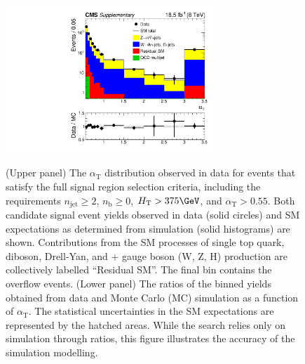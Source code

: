 \clearpage
\begin{figure}[h!]
  \begin{center}
    \includegraphics[width=0.7\textwidth]{AlphaT_SR} \\
    \caption{ (Upper panel) The $\alpha_\text{T}$ distribution
      observed in data for events that satisfy the full signal region
      selection criteria, including the requirements $n_\text{jet}
      \geq 2$, $n_\text{b} \geq 0$, $H_\text{T} > 375\GeV$, and
      $\alpha_\text{T} > 0.55$. Both candidate signal event yields
      observed in data (solid circles) and SM expectations as
      determined from simulation (solid histograms) are
      shown. Contributions from the SM processes of single top quark,
      diboson, Drell-Yan, and \ttbar + gauge boson (W, Z, H)
      production are collectively labelled ``Residual SM''. The final
      bin contains the overflow events.  (Lower panel) The ratios of
      the binned yields obtained from data and Monte Carlo (MC)
      simulation as a function of $\alpha_\text{T}$. The statistical
      uncertainties in the SM expectations are represented by the
      hatched areas. While the search relies only on simulation
      through ratios, this figure illustrates the accuracy of the
      simulation modelling. }
  \end{center}
\end{figure}

